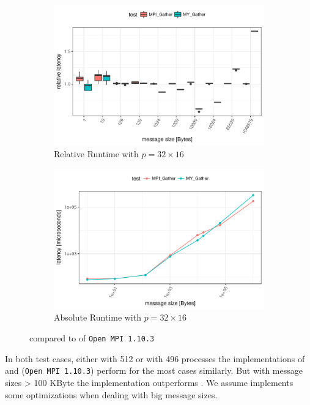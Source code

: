 \begin{figure}[H]
    \begin{subfigure}[b]{0.49\textwidth}
        \includegraphics[width=\textwidth]{../benchmarks/openmpi/binom/gather_32/rel_runtime.pdf}
        \caption{Relative Runtime with $p=32 \times 16$}
        \label{fig:Gather:OpenMPI:Rel:32}
    \end{subfigure}
    \begin{subfigure}[b]{0.49\textwidth}
        \includegraphics[width=\textwidth]{../benchmarks/openmpi/binom/gather_32/runtime.pdf}
        \caption{Absolute Runtime with $p=32 \times 16$}
        \label{fig:Gather:OpenMPI:Abs:32}
    \end{subfigure}
    
    \caption{\mygather compared to \mpigather of \texttt{Open MPI 1.10.3}}
\end{figure}

In both test cases, either with 512 or with 496 processes the implementations of \mygather and \mpigather (\texttt{Open MPI 1.10.3}) perform for the most cases similarly.
But with message sizes > 100 KByte the \mpigather implementation outperforms \mygather. We assume \mpigather implements some optimizations when dealing with big message sizes.

